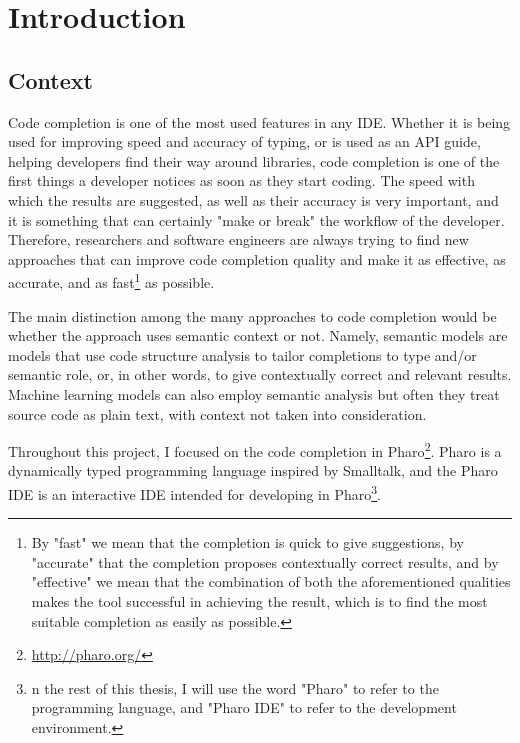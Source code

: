 \chapter{Introduction}
\label{chap:Introduction}

\section{Context}
\label{sec:Introduction-Context}
Code completion is one of the most used features in any IDE. Whether it is being used for improving speed and accuracy of typing, or is used as an API guide, helping developers find their way around libraries, code completion is one of the first things a developer notices as soon as they start coding. The speed with which the results are suggested, as well as their accuracy is very important, and it is something that can certainly "make or break" the workflow of the developer. Therefore, researchers and software engineers are always trying to find new approaches that can improve code completion quality and make it as effective, as accurate, and as fast\footnote{By "fast" we mean that the completion is quick to give suggestions, by "accurate" that the completion proposes contextually correct results, and by "effective" we mean that the combination of both the aforementioned qualities makes the tool successful in achieving the result, which is to find the most suitable completion as easily as possible.} as possible.

The main distinction among the many approaches to code completion would be whether the approach uses semantic context or not. Namely, semantic models are models that use code structure analysis to tailor completions to type and/or semantic role, or, in other words, to give contextually correct and relevant results. Machine learning models can also employ semantic analysis but often they treat source code as plain text, with context not taken into consideration.

Throughout this project, I focused on the code completion in Pharo\footnote{\url{http://pharo.org/}}. Pharo is a dynamically typed programming language inspired by Smalltalk, and the Pharo IDE is an interactive IDE intended for developing in Pharo\footnote{n the rest of this thesis, I will use the word "Pharo" to refer to the programming language, and "Pharo IDE" to refer to the development environment.}.

